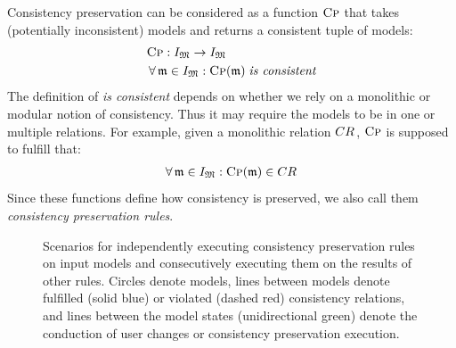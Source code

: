 Consistency preservation can be considered as a function $\textsc{Cp}$ that takes (potentially inconsistent) models and returns a consistent tuple of models:
\begin{align*}
    & \function{Cp} : \metamodeltupleinstanceset{M} \rightarrow \metamodeltupleinstanceset{M}\\
    & \forall \modeltuple{m} \in \metamodeltupleinstanceset{M} : \function{Cp}(\modeltuple{m}) \mathtextspacebefore{is consistent}
\end{align*}
The definition of \emph{is consistent} depends on whether we rely on a monolithic or modular notion of consistency.
Thus it may require the models to be in one or multiple relations.
For example, given a monolithic relation $\consistencyrelation{CR}{}$, $\textsc{Cp}$ is supposed to fulfill that: 
\begin{align*}
    \forall \modeltuple{m} \in \metamodeltupleinstanceset{M} : \function{Cp}(\modeltuple{m}) \in \consistencyrelation{CR}{}
\end{align*}
Since these functions define how consistency is preserved, we also call them \emph{consistency preservation rules}.

\begin{figure}
    \centering
    
    \caption[Execution alternatives of consistency preservation rules]{Scenarios for independently executing consistency preservation rules on input models and consecutively executing them on the results of other rules. Circles denote models, lines between models denote fulfilled (solid blue) or violated (dashed red) consistency relations, and lines between the model states (unidirectional green) denote the conduction of user changes or consistency preservation execution.}
    \label{fig:correctness:concurrent_consecutive_execution}
\end{figure}

